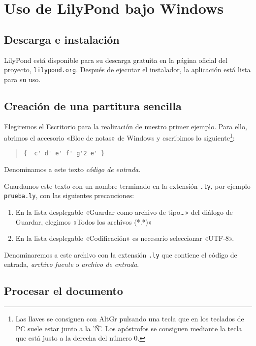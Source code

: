 
\section{Uso de LilyPond bajo Windows}
\subsection{Descarga e instalación}

LilyPond está disponible para su descarga gratuita en la página
oficial del proyecto, \texttt{lilypond.org}.  Después de
ejecutar el instalador, la aplicación está lista para su uso.

\subsection{Creación de una partitura sencilla}

Elegiremos el Escritorio para la realización de nuestro primer
ejemplo. Para ello, abrimos el accesorio «Bloc de notas» de Windows y
escribimos lo siguiente\footnote{Las llaves se consiguen con AltGr
  pulsando una tecla que en los teclados de PC suele estar junto a la
  'Ñ'. Los apóstrofos se consiguen mediante la tecla que está justo a
  la derecha del número 0.}:

\begin{quote}
\begin{verbatim}
{  c' d' e' f' g'2 e' }
\end{verbatim}
\end{quote}

Denominamos a este texto \emph{código de entrada}.

Guardamos este texto con un nombre terminado en la extensión
\verb+.ly+, por ejemplo \verb+prueba.ly+, con las siguientes
precauciones:

\begin{enumerate}
\item En la lista desplegable «Guardar como archivo de tipo\ldots» del
  diálogo de Guardar, elegimos «Todos los archivos (*.*)»
\item En la lista desplegable «Codificación» es necesario seleccionar
  «UTF-8».
\end{enumerate}

Denominaremos a este archivo con la extensión \verb+.ly+ que
contiene el código de entrada, \emph{archivo fuente} o
\emph{archivo de entrada}.

\subsection{Procesar el documento}

